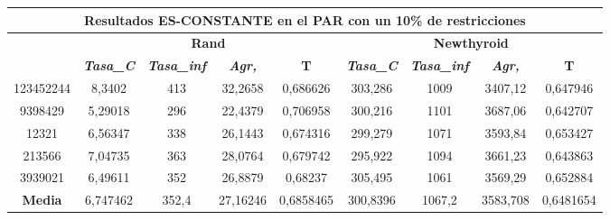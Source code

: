 \documentclass[12pt, spanish]{article}
\begin{document}
\begin{table}[H]
\begin{tabular}{|c|c|c|c|c|c|c|c|c|}
\hline
\multicolumn{9}{|c|}{\textbf{Resultados ES-CONSTANTE en el PAR con un 10\% de restricciones}}                                                                                                                     \\ \hline
\multirow{2}{*}{} & \multicolumn{4}{c|}{\textbf{Rand}}                                                            & \multicolumn{4}{c|}{\textbf{Newthyroid}}                                                      \\ \cline{2-9} 
                  & \textit{\textbf{Tasa\_C}} & \textit{\textbf{Tasa\_inf}} & \textit{\textbf{Agr,}} & \textbf{T} & \textit{\textbf{Tasa\_C}} & \textit{\textbf{Tasa\_inf}} & \textit{\textbf{Agr,}} & \textbf{T} \\ \hline
123452244         & 8,3402                    & 413                         & 32,2658                & 0,686626   & 303,286                   & 1009                        & 3407,12                & 0,647946   \\ \hline
9398429           & 5,29018                   & 296                         & 22,4379                & 0,706958   & 300,216                   & 1101                        & 3687,06                & 0,642707   \\ \hline
12321             & 6,56347                   & 338                         & 26,1443                & 0,674316   & 299,279                   & 1071                        & 3593,84                & 0,653427   \\ \hline
213566            & 7,04735                   & 363                         & 28,0764                & 0,679742   & 295,922                   & 1094                        & 3661,23                & 0,643863   \\ \hline
3939021           & 6,49611                   & 352                         & 26,8879                & 0,68237    & 305,495                   & 1061                        & 3569,29                & 0,652884   \\ \hline
\textbf{Media}    & 6,747462                  & 352,4                       & 27,16246               & 0,6858465  & 300,8396                  & 1067,2                      & 3583,708               & 0,6481654  \\ \hline
\end{tabular}
\end{table}
\end{document}
